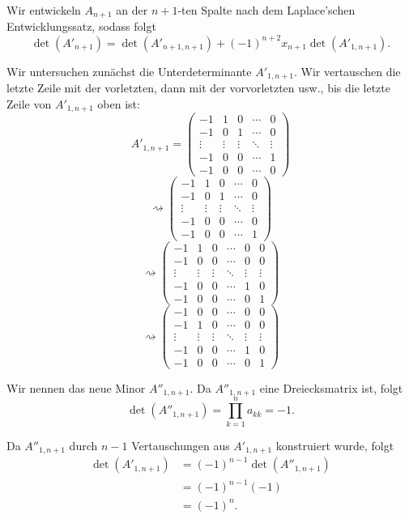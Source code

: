 \documentclass[a4paper,12pt]{article}
\begin{document}
Wir entwickeln $A_{n+1}$ an der $n{+}1$-ten Spalte nach dem Laplace'schen Entwicklungssatz, sodass folgt
\[
\det(A'_{n+1}) = \det(A'_{n+1,n+1}) + (-1)^{n+2} x_{n+1} \det(A'_{1,n+1}).
\]

Wir untersuchen zunächst die Unterdeterminante $A'_{1,n+1}$. Wir vertauschen die letzte Zeile mit der vorletzten, dann mit der vorvorletzten usw., bis die letzte Zeile von $A'_{1,n+1}$ oben ist:
\[
A'_{1,n+1} =
\begin{pmatrix}
-1 & 1 & 0 & \cdots & 0 \\
-1 & 0 & 1 & \cdots & 0 \\
\vdots & \vdots & \vdots & \ddots & \vdots \\
-1 & 0 & 0 & \cdots & 1 \\
-1 & 0 & 0 & \cdots & 0
\end{pmatrix}
\]
\[
\rightsquigarrow
\begin{pmatrix}
-1 & 1 & 0 & \cdots & 0 \\
-1 & 0 & 1 & \cdots & 0 \\
\vdots & \vdots & \vdots & \ddots & \vdots \\
-1 & 0 & 0 & \cdots & 0 \\
-1 & 0 & 0 & \cdots & 1
\end{pmatrix}
\]
\[
\rightsquigarrow
\begin{pmatrix}
-1 & 1 & 0 & \cdots & 0 & 0 \\
-1 & 0 & 0 & \cdots & 0 & 0 \\
\vdots & \vdots & \vdots & \ddots & \vdots & \vdots \\
-1 & 0 & 0 & \cdots & 1 & 0 \\
-1 & 0 & 0 & \cdots & 0 & 1
\end{pmatrix}
\]
\[
\rightsquigarrow
\begin{pmatrix}
-1 & 0 & 0 & \cdots & 0 & 0 \\
-1 & 1 & 0 & \cdots & 0 & 0 \\
\vdots & \vdots & \vdots & \ddots & \vdots & \vdots \\
-1 & 0 & 0 & \cdots & 1 & 0 \\
-1 & 0 & 0 & \cdots & 0 & 1
\end{pmatrix}
\]

Wir nennen das neue Minor $A''_{1,n+1}$. Da $A''_{1,n+1}$ eine Dreiecksmatrix ist, folgt
\[
\det(A''_{1,n+1}) = \prod_{k=1}^{n} a_{kk} = -1.
\]

Da $A''_{1,n+1}$ durch $n-1$ Vertauschungen aus $A'_{1,n+1}$ konstruiert wurde, folgt
\begin{align*}
\det(A'_{1,n+1}) &= (-1)^{n-1} \det(A''_{1,n+1}) \\
                 &= (-1)^{n-1} (-1) \\
                 &= (-1)^{n}.
\end{align*}
\end{document}
